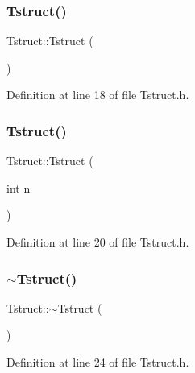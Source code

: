 \subsubsection{\texorpdfstring{Tstruct()}{Tstruct()}\hspace{0.1cm}{\footnotesize\ttfamily [1/2]}}
{\footnotesize\ttfamily Tstruct\+::\+Tstruct (\begin{DoxyParamCaption}{ }\end{DoxyParamCaption})\hspace{0.3cm}{\ttfamily [inline]}}



Definition at line 18 of file Tstruct.\+h.

\mbox{\label{structTstruct_a935b2752cee46ed2c9d4e76a344bdbf0}} 
\subsubsection{\texorpdfstring{Tstruct()}{Tstruct()}\hspace{0.1cm}{\footnotesize\ttfamily [2/2]}}
{\footnotesize\ttfamily Tstruct\+::\+Tstruct (\begin{DoxyParamCaption}\item[{int}]{n }\end{DoxyParamCaption})\hspace{0.3cm}{\ttfamily [inline]}}



Definition at line 20 of file Tstruct.\+h.

\mbox{\label{structTstruct_ac50ed5735a37a3d90fed214c86ddab09}} 
\subsubsection{\texorpdfstring{$\sim$\+Tstruct()}{~Tstruct()}}
{\footnotesize\ttfamily Tstruct\+::$\sim$\+Tstruct (\begin{DoxyParamCaption}{ }\end{DoxyParamCaption})\hspace{0.3cm}{\ttfamily [inline]}}



Definition at line 24 of file Tstruct.\+h.



